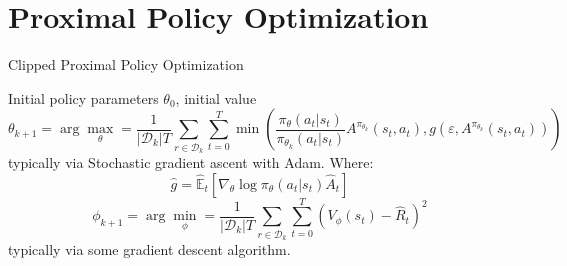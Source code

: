 \chapter{Proximal Policy Optimization}

\begin{algorithm}[H]
    \caption{Clipped Proximal Policy Optimization}
    \label{alg:ppo}
    \begin{algorithmic}[1]
    \REQUIRE Initial policy parameters $\theta _0$, initial value
    $$
\theta _{k + 1} = \arg\max _{\theta} = \frac{1}{|\mathcal{D} _k|T} \sum _{r \in \mathcal{D} _k} \sum _{t = 0} ^{T} \min \left( \frac{\pi _{\theta} (a _t | s _t)}{\pi _{\theta_k} (a _t | s _t)} A ^{\pi _{\theta_k}} (s _t, a _t), g(\varepsilon, A ^{\pi _{\theta_k}}(s _t, a _t)) \right)
    $$    
    typically via Stochastic gradient ascent with Adam. Where:
    $$
\hat{g} = \hat{\mathbb{E}} _t \left[\nabla _{\theta}\log\pi _{\theta}(a _t | s _t) \hat{A} _t\right]
$$
    $$
    \phi _{k + 1} = \arg\min _{\phi} = \frac{1}{|\mathcal{D} _k|T} \sum _{r \in \mathcal{D} _k} \sum _{t = 0} ^{T} \left(V _{\phi}(s _t) - \hat{R} _t \right)^2
$$
typically via some gradient descent algorithm.
    \ENDFOR 
    \end{algorithmic}
\end{algorithm} 

